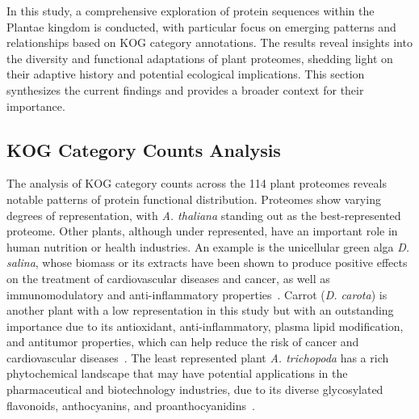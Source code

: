 
In this study, a comprehensive exploration of protein 
sequences within the Plantae kingdom is conducted, with 
particular focus on emerging patterns and relationships 
based on KOG category annotations. The results reveal 
insights into the diversity and functional adaptations of 
plant proteomes, shedding light on their adaptive history 
and potential ecological implications. This section 
synthesizes the current findings and provides a broader 
context for their importance.


\subsection{KOG Category Counts Analysis}
\label{sec:conclusion.kogcount}

The analysis of KOG category counts across the 114 plant 
proteomes reveals notable patterns of protein functional 
distribution. Proteomes show varying degrees of 
representation, with \emph{A. thaliana} standing out as 
the best-represented proteome. Other plants, although under 
represented, have an important role in human nutrition or 
health industries. An example is the unicellular green 
alga \emph{D. salina}, whose 
biomass or its extracts have been shown to produce 
positive effects on the treatment of cardiovascular 
diseases and cancer, as well as immunomodulatory and 
anti-inflammatory properties~\citep{hyrslova2022}. 
Carrot (\emph{D. carota}) is another plant 
with a low representation in this study but with an 
outstanding importance due to its antioxidant, 
anti-inflammatory, plasma lipid modification, and 
antitumor properties, which can help reduce the risk of 
cancer and cardiovascular diseases~\citep{ahmad2019}. The 
least represented plant \emph{A. trichopoda} has a rich 
phytochemical landscape that may have potential applications 
in the pharmaceutical and biotechnology industries, due to 
its diverse glycosylated flavonoids, anthocyanins, and 
proanthocyanidins~\citep{wu2019}. 

